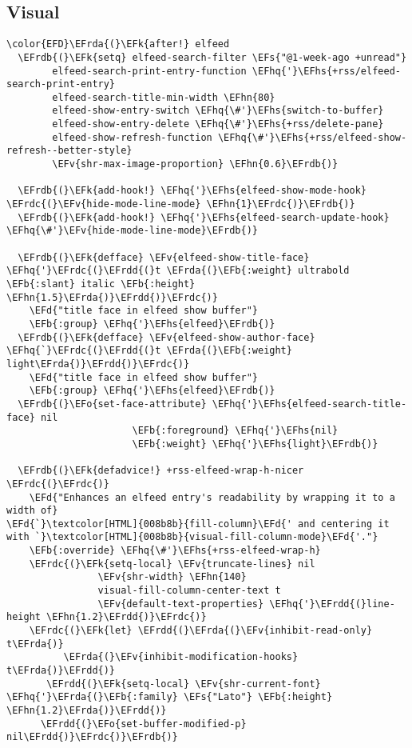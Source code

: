 \documentclass[c]{article}
\theoremstyle{plain}%
\theoremstyle{definition}
\theoremstyle{remark}
\newcommand{\EFs}[1]{\textcolor{EFs}{#1}} %
\newcommand{\EFd}[1]{\textcolor{EFd}{#1}} %
\newcommand{\EFk}[1]{\textcolor{EFk}{#1}} %
\newcommand{\EFb}[1]{\textcolor{EFb}{#1}} %
\newcommand{\EFv}[1]{\textcolor{EFv}{#1}} %
\newcommand{\EFo}[1]{\textcolor{EFo}{#1}} %
\newcommand{\EFhn}[1]{\textcolor{EFhn}{#1}} %
\newcommand{\EFhq}[1]{\textcolor{EFhq}{#1}} %
\newcommand{\EFhs}[1]{\textcolor{EFhs}{#1}} %
\newcommand{\EFrda}[1]{\textcolor{EFrda}{#1}} %
\newcommand{\EFrdb}[1]{\textcolor{EFrdb}{#1}} %
\newcommand{\EFrdc}[1]{\textcolor{EFrdc}{#1}} %
\newcommand{\EFrdd}[1]{\textcolor{EFrdd}{#1}} %
\begin{document}
\subsection{Visual}
\label{sec:orgd61f116}
\begin{Code}
\begin{Verbatim}
\color{EFD}\EFrda{(}\EFk{after!} elfeed
  \EFrdb{(}\EFk{setq} elfeed-search-filter \EFs{"@1-week-ago +unread"}
        elfeed-search-print-entry-function \EFhq{'}\EFhs{+rss/elfeed-search-print-entry}
        elfeed-search-title-min-width \EFhn{80}
        elfeed-show-entry-switch \EFhq{\#'}\EFhs{switch-to-buffer}
        elfeed-show-entry-delete \EFhq{\#'}\EFhs{+rss/delete-pane}
        elfeed-show-refresh-function \EFhq{\#'}\EFhs{+rss/elfeed-show-refresh--better-style}
        \EFv{shr-max-image-proportion} \EFhn{0.6}\EFrdb{)}

  \EFrdb{(}\EFk{add-hook!} \EFhq{'}\EFhs{elfeed-show-mode-hook} \EFrdc{(}\EFv{hide-mode-line-mode} \EFhn{1}\EFrdc{)}\EFrdb{)}
  \EFrdb{(}\EFk{add-hook!} \EFhq{'}\EFhs{elfeed-search-update-hook} \EFhq{\#'}\EFv{hide-mode-line-mode}\EFrdb{)}

  \EFrdb{(}\EFk{defface} \EFv{elfeed-show-title-face} \EFhq{'}\EFrdc{(}\EFrdd{(}t \EFrda{(}\EFb{:weight} ultrabold \EFb{:slant} italic \EFb{:height} \EFhn{1.5}\EFrda{)}\EFrdd{)}\EFrdc{)}
    \EFd{"title face in elfeed show buffer"}
    \EFb{:group} \EFhq{'}\EFhs{elfeed}\EFrdb{)}
  \EFrdb{(}\EFk{defface} \EFv{elfeed-show-author-face} \EFhq{`}\EFrdc{(}\EFrdd{(}t \EFrda{(}\EFb{:weight} light\EFrda{)}\EFrdd{)}\EFrdc{)}
    \EFd{"title face in elfeed show buffer"}
    \EFb{:group} \EFhq{'}\EFhs{elfeed}\EFrdb{)}
  \EFrdb{(}\EFo{set-face-attribute} \EFhq{'}\EFhs{elfeed-search-title-face} nil
                      \EFb{:foreground} \EFhq{'}\EFhs{nil}
                      \EFb{:weight} \EFhq{'}\EFhs{light}\EFrdb{)}

  \EFrdb{(}\EFk{defadvice!} +rss-elfeed-wrap-h-nicer \EFrdc{(}\EFrdc{)}
    \EFd{"Enhances an elfeed entry's readability by wrapping it to a width of}
\EFd{`}\textcolor[HTML]{008b8b}{fill-column}\EFd{' and centering it with `}\textcolor[HTML]{008b8b}{visual-fill-column-mode}\EFd{'."}
    \EFb{:override} \EFhq{\#'}\EFhs{+rss-elfeed-wrap-h}
    \EFrdc{(}\EFk{setq-local} \EFv{truncate-lines} nil
                \EFv{shr-width} \EFhn{140}
                visual-fill-column-center-text t
                \EFv{default-text-properties} \EFhq{'}\EFrdd{(}line-height \EFhn{1.2}\EFrdd{)}\EFrdc{)}
    \EFrdc{(}\EFk{let} \EFrdd{(}\EFrda{(}\EFv{inhibit-read-only} t\EFrda{)}
          \EFrda{(}\EFv{inhibit-modification-hooks} t\EFrda{)}\EFrdd{)}
       \EFrdd{(}\EFk{setq-local} \EFv{shr-current-font} \EFhq{'}\EFrda{(}\EFb{:family} \EFs{"Lato"} \EFb{:height} \EFhn{1.2}\EFrda{)}\EFrdd{)}
      \EFrdd{(}\EFo{set-buffer-modified-p} nil\EFrdd{)}\EFrdc{)}\EFrdb{)}


\end{Verbatim}
\end{Code}
\end{document}
